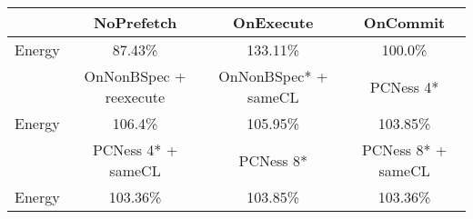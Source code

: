 \begin{tabular}{ l|ccc }
 & NoPrefetch & OnExecute & OnCommit\\ \hline
Energy
 & 87.43\% & 133.11\% & 100.0\%\\ \hline
\hline
 & OnNonBSpec + reexecute & OnNonBSpec* + sameCL & PCNess 4*\\ \hline
Energy
 & 106.4\% & 105.95\% & 103.85\%\\ \hline
\hline
 & PCNess 4* + sameCL & PCNess 8* & PCNess 8* + sameCL\\ \hline
Energy
 & 103.36\% & 103.85\% & 103.36\%\\ \hline
\end{tabular}

